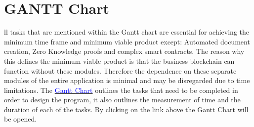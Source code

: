 \let\textcircled=\pgftextcircled
\chapter{GANTT Chart}

ll tasks that are mentioned within the Gantt chart are essential for achieving the minimum time frame and minimum viable product except: Automated document creation, Zero Knowledge proofs and complex smart contracts. The reason why this defines the minimum viable product is that the business blockchain can function without these modules. Therefore the dependence on these separate modules of the entire application is minimal and may be disregarded due to time limitations. The \href{run:./gantt.xlsx}{\textcolor{blue}{Gantt Chart}} outlines the tasks that need to be completed in order to design the program, it also outlines the measurement of time and the duration of each of the tasks. By clicking on the link above the Gantt Chart will be opened.
